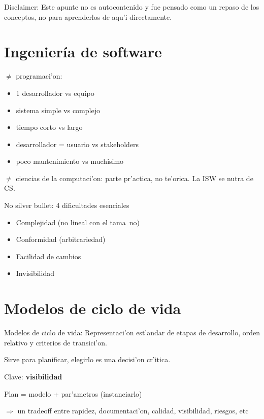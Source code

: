 \documentclass[a4paper,spanish]{article}
\begin{document}
Disclaimer: Este apunte no es autocontenido y fue pensado como un repaso de los conceptos, 
no para aprenderlos de aqu'i directamente.
\begin{multicols}{2}
\tableofcontents
\end{multicols}

\section{Ingenier\'ia de software}

$\neq$ programaci'on:
\begin{itemize}
\item 1 desarrollador vs equipo
\item sistema simple vs complejo
\item tiempo corto vs largo
\item desarrollador = usuario vs stakeholders
\item poco mantenimiento vs muchisimo
\end{itemize}

$\neq$ ciencias de la computaci'on: parte pr'actica, no te'orica. 
La ISW se nutra de CS.

No silver bullet: 4 dificultades esenciales
\begin{itemize}
\item Complejidad (no lineal con el tama~no)
\item Conformidad (arbitrariedad)
\item Facilidad de cambios
\item Invisibilidad
\end{itemize}

\section{Modelos de ciclo de vida}

Modelos de ciclo de vida: Representaci'on est'andar de etapas de desarrollo,
orden relativo y criterios de transici'on.

Sirve para planificar, elegirlo es una decisi'on cr'itica.

Clave: \textbf{visibilidad}

Plan = modelo + par'ametros (instanciarlo)

$\Rightarrow$ un tradeoff entre rapidez, documentaci'on, calidad, visibilidad,
riesgos, etc
\end{document}
